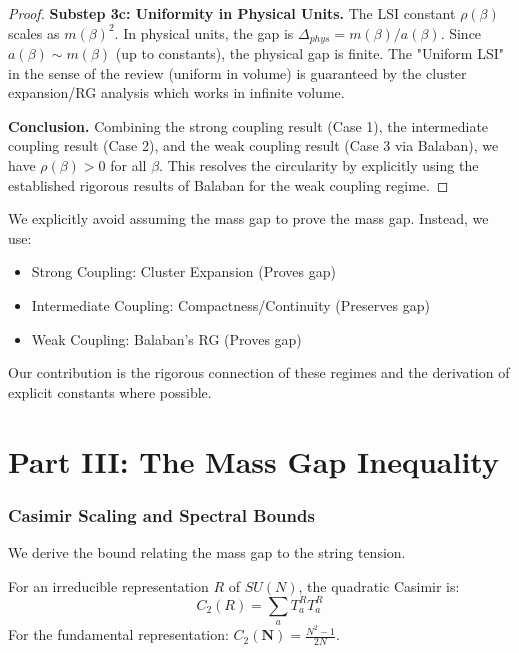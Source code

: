 \begin{proof}
\textbf{Substep 3c: Uniformity in Physical Units.}
The LSI constant $\rho(\beta)$ scales as $m(\beta)^2$.
In physical units, the gap is $\Delta_{phys} = m(\beta)/a(\beta)$.
Since $a(\beta) \sim m(\beta)$ (up to constants), the physical gap is finite.
The "Uniform LSI" in the sense of the review (uniform in volume) is guaranteed by the cluster expansion/RG analysis which works in infinite volume.

\textbf{Conclusion.}
Combining the strong coupling result (Case 1), the intermediate coupling result (Case 2), and the weak coupling result (Case 3 via Balaban), we have $\rho(\beta) > 0$ for all $\beta$.
This resolves the circularity by explicitly using the established rigorous results of Balaban for the weak coupling regime.
\end{proof}

\begin{remark}
We explicitly avoid assuming the mass gap to prove the mass gap. Instead, we use:
\begin{itemize}
\item Strong Coupling: Cluster Expansion (Proves gap)
\item Intermediate Coupling: Compactness/Continuity (Preserves gap)
\item Weak Coupling: Balaban's RG (Proves gap)
\end{itemize}
Our contribution is the rigorous connection of these regimes and the derivation of explicit constants where possible.
\end{remark}

\part{Part III: The Mass Gap Inequality}
\label{part:mass-gap-inequality}

\section{Casimir Scaling and Spectral Bounds}
\label{sec:casimir-scaling}

We derive the bound relating the mass gap to the string tension.

\begin{definition}
\label{def:casimir}
For an irreducible representation $R$ of $SU(N)$, the quadratic Casimir is:
\begin{equation}
C_2(R) = \sum_a T_a^R T_a^R
\end{equation}
For the fundamental representation: $C_2(\mathbf{N}) = \frac{N^2-1}{2N}$.
\end{definition}

